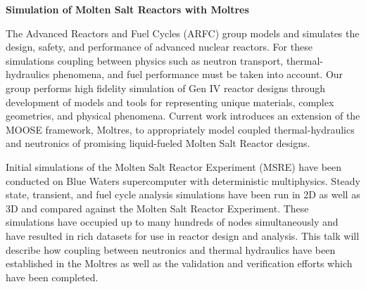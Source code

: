 \documentclass[11pt]{article}
\newcommand{\authorname}{Kathryn~D.~Huff }
\newcommand{\authorsite}{arfc.npre.illinois.edu}
\begin{document}
\pagestyle{fancy}
\lhead{\textcolor{gray}{Investigator: Prof. \authorname\\Presenter: Mr. Andrei Rykhlevskii}}
\rhead{\textcolor{gray}{University of Illinois at Urbana-Champaign\\}}
\renewcommand{\headrulewidth}{0pt}
\renewcommand{\footrulewidth}{0pt}
\fancyfoot[C]{\footnotesize \textcolor{gray}{\authorsite}}
   \begin{center}
      \Large\textbf{Simulation of Molten Salt Reactors with Moltres}\\
   \end{center}

The Advanced Reactors and Fuel Cycles (ARFC) group models and simulates the design, safety, and performance of advanced nuclear reactors. For these simulations coupling between physics such as neutron transport, thermal-hydraulics phenomena, and fuel performance must be taken into account. Our group performs high fidelity simulation of Gen IV reactor designs through development of models and tools for representing unique materials, complex geometries, and physical phenomena. Current work introduces an extension of the MOOSE framework, Moltres, to appropriately model coupled thermal-hydraulics and neutronics of promising liquid-fueled Molten Salt Reactor designs. 

Initial simulations of the Molten Salt Reactor Experiment (MSRE) have been conducted on Blue Waters supercomputer with deterministic multiphysics. Steady state, transient, and fuel cycle analysis simulations have been run in 2D as well as 3D and compared against the Molten Salt Reactor Experiment. These simulations
have occupied up to many hundreds of nodes simultaneously and have resulted in rich datasets
for use in reactor design and analysis. This talk will describe how coupling between neutronics and thermal hydraulics have been established in the Moltres as well as the validation and verification efforts which have been completed. 
\end{document}
